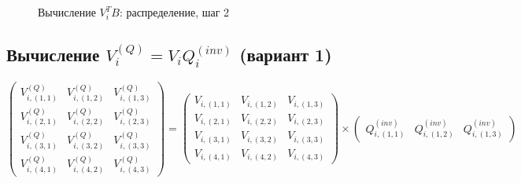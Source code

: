 \begin{figure}
	\caption{Вычисление $V_i^T B$: распределение, шаг 2}
\end{figure}

\subsection{Вычисление $V_i^{(Q)} = V_i Q_i^{(inv)}$ (вариант 1)}
$$
	\begin{pmatrix}
		V_{i,(1,1)}^{(Q)} & V_{i,(1,2)}^{(Q)} & V_{i,(1,3)}^{(Q)} \\
		V_{i,(2,1)}^{(Q)} & V_{i,(2,2)}^{(Q)} & V_{i,(2,3)}^{(Q)} \\
		V_{i,(3,1)}^{(Q)} & V_{i,(3,2)}^{(Q)} & V_{i,(3,3)}^{(Q)} \\
		V_{i,(4,1)}^{(Q)} & V_{i,(4,2)}^{(Q)} & V_{i,(4,3)}^{(Q)}
	\end{pmatrix}
	=
	\begin{pmatrix}
		V_{i,(1,1)} & V_{i,(1,2)} & V_{i,(1,3)} \\
		V_{i,(2,1)} & V_{i,(2,2)} & V_{i,(2,3)} \\
		V_{i,(3,1)} & V_{i,(3,2)} & V_{i,(3,3)} \\
		V_{i,(4,1)} & V_{i,(4,2)} & V_{i,(4,3)}
	\end{pmatrix}
	\times
	\begin{pmatrix}
		Q_{i,(1,1)}^{(inv)} & Q_{i,(1,2)}^{(inv)} & Q_{i,(1,3)}^{(inv)}
	\end{pmatrix}
$$

